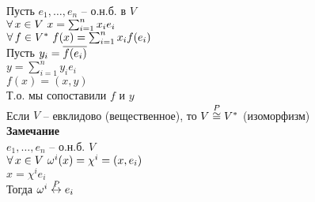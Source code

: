 \documentclass[12pt]{article}
\begin{document}
Пусть $e_1, \ldots, e_n$ -- о.н.б. в $V$\\
$\forall\, x \in V\ x=\sum_{i=1}^n x_ie_i$\\
$\forall\, f \in V^*\ f(x) = \sum_{i=1}^n x_if(e_i)$\\
Пусть $y_i = \overline{f(e_i)}$\\
$y = \sum_{i=1}^n y_i e_i$\\
$f(x) = (x,y)$\\
Т.о. мы сопоставили $f$ и $y$\\
Если $V$ -- евклидово (вещественное), то $V \overset{P}\cong V^*$ (изоморфизм)\\
\textbf{Замечание}\\
$e_1, \ldots, e_n$ -- о.н.б. $V$\\
$\forall\, x \in V\ \omega^i(x) = \chi^i = (x, e_i)$\\
$x = \chi^i e_i$\\
Тогда $\omega^i \overset{P}{\leftrightarrow} e_i$
\end{document}
